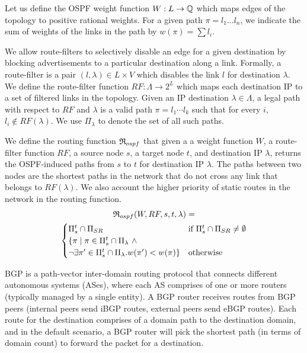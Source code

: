 Let us
define the OSPF weight function $W: L \rightarrow \mathbb{Q}$ which 
maps edges of the topology to positive rational weights. 
For a given
path $\pi=l_1\ldots l_n$, we indicate the sum of weights of the
links in the path by $w(\pi)=\sum l_i$. 


We allow route-filters
to selectively disable an
edge for a given destination by  
blocking advertisements to a
particular destination along a link. 
Formally, a route-filter is a pair $(l,\lambda)\in L\times V$
which disables the link $l$ for destination $\lambda$. 
We define the route-filter function 
$RF: \Lambda \rightarrow 2^L$ which maps each destination IP
to a set of filtered links in the topology. 
Given an IP destination $\lambda\in \Lambda$, 
a legal path with respect to $RF$ and $\lambda$
is a valid path $\pi=l_1\cdots l_k$ such that for every $i$,
$l_i\not\in RF(\lambda)$.
We use $\Pi_\lambda$ to denote the set of all such paths.

We define the routing function 
$\mathfrak{R}_{ospf}$ 
that given a 
a weight function $W$,
a route-filter function $RF$,
a source node $s$,
a target node $t$,
and destination IP 
$\lambda$,
returns the OSPF-induced paths from $s$ to $t$ for destination IP $\lambda$.
The paths between two nodes are
the shortest paths in the network
that do not cross any link that belongs to $RF(\lambda)$. We also
account the higher priority of static routes 
in the network in the routing function.
\begin{multline} \label{eq:ospfmodel}
\mathfrak{R}_{ospf}(W,RF,s,t,\lambda) = \\
\begin{cases}
\text{$\Pi_s^t \cap \Pi_{SR}$}  & \text{if $\Pi_s^t \cap \Pi_{SR} \not=\emptyset$} \\
\text{$\{\pi \mid  \pi\in \Pi_s^t\cap \Pi_\lambda ~\wedge $} & \\
\text{$\neg\exists \pi'\in\Pi_s^t\cap \Pi_\lambda . w(\pi')< w(\pi)\}$} & \text{otherwise}
\end{cases}
\end{multline}

BGP is a path-vector inter-domain 
routing protocol that connects 
different autonomous systems (ASes), where each AS
comprises of one or more routers (typically managed
by a single entity). A BGP router receives routes 
from BGP peers (internal peers send iBGP routes, 
external peers send eBGP routes). Each route 
for the destination comprises of a domain path
 to the destination domain, and in the default
 scenario, a BGP router will pick the shortest
 path (in terms of domain count) to forward
 the packet for a destination. 
 
